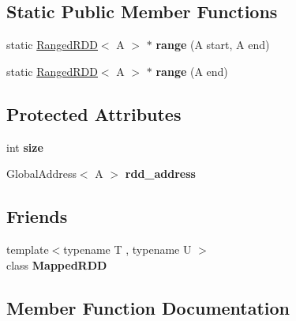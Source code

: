 \subsection*{Static Public Member Functions}
\begin{DoxyCompactItemize}
\item 
\hypertarget{class_r_d_d_abf5c7a7da50a4b5ff2ebc382ed2a3720}{}static \hyperlink{class_ranged_r_d_d}{Ranged\+R\+D\+D}$<$ A $>$ $\ast$ {\bfseries range} (A start, A end)\label{class_r_d_d_abf5c7a7da50a4b5ff2ebc382ed2a3720}

\item 
\hypertarget{class_r_d_d_acfa2ab9edf80c598f917a42aa08f6b85}{}static \hyperlink{class_ranged_r_d_d}{Ranged\+R\+D\+D}$<$ A $>$ $\ast$ {\bfseries range} (A end)\label{class_r_d_d_acfa2ab9edf80c598f917a42aa08f6b85}

\end{DoxyCompactItemize}
\subsection*{Protected Attributes}
\begin{DoxyCompactItemize}
\item 
\hypertarget{class_r_d_d_ad6d07c0d1bc8894b8dc15ac80cf6f73b}{}int {\bfseries size}\label{class_r_d_d_ad6d07c0d1bc8894b8dc15ac80cf6f73b}

\item 
\hypertarget{class_r_d_d_ab77cd5f6dbfea70169ea3c91e227f589}{}Global\+Address$<$ A $>$ {\bfseries rdd\+\_\+address}\label{class_r_d_d_ab77cd5f6dbfea70169ea3c91e227f589}

\end{DoxyCompactItemize}
\subsection*{Friends}
\begin{DoxyCompactItemize}
\item 
\hypertarget{class_r_d_d_aa90384db8e0bab61dfec3a641938e7db}{}{\footnotesize template$<$typename T , typename U $>$ }\\class {\bfseries Mapped\+R\+D\+D}\label{class_r_d_d_aa90384db8e0bab61dfec3a641938e7db}

\end{DoxyCompactItemize}


\subsection{Member Function Documentation}
\hypertarget{class_r_d_d_afb3f661ea1cc3aac6dbe66f764de1e43}{}

